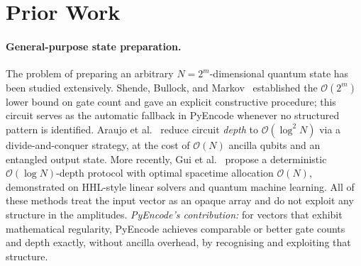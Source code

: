 \documentclass[10pt,twocolumn]{article}
\begin{document}
\section{Prior Work}
\label{sec:priorwork}

\paragraph{General-purpose state preparation.}
The problem of preparing an arbitrary $N = 2^m$-dimensional quantum
state has been studied extensively.
Shende, Bullock, and Markov~\cite{shende2006} established the
$\mathcal{O}(2^m)$ lower bound on gate count and gave an explicit
constructive procedure; this circuit serves as the automatic fallback
in PyEncode whenever no structured pattern is identified.
Araujo et al.~\cite{araujo2021divide} reduce circuit \emph{depth} to
$\mathcal{O}(\log^2 N)$ via a divide-and-conquer strategy, at the cost
of $\mathcal{O}(N)$ ancilla qubits and an entangled output state.
More recently, Gui et al.~\cite{gui2024spacetime} propose a
deterministic $\mathcal{O}(\log N)$-depth protocol with optimal
spacetime allocation $\mathcal{O}(N)$, demonstrated on HHL-style
linear solvers and quantum machine learning.
All of these methods treat the input vector as an opaque array and do
not exploit any structure in the amplitudes.
\emph{PyEncode's contribution:} for vectors that exhibit mathematical
regularity, PyEncode achieves comparable or better gate counts and
depth exactly, without ancilla overhead, by recognising and exploiting
that structure.
\end{document}
